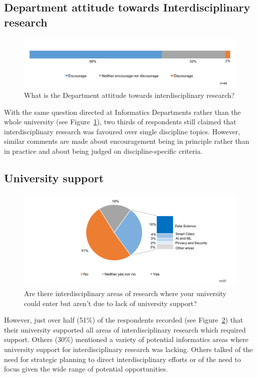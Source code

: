 \subsection{Department attitude towards Interdisciplinary research}


\begin{figure}[h]
\centering
\includegraphics[width = \linewidth]{charts/1b.png}
\caption{What is the Department attitude towards interdisciplinary research?}
\label{sect1:Dattitude}
\end{figure}

With the same question directed at Informatics Departments rather than the whole university (see Figure~\ref{sect1:Dattitude}), two thirds of respondents still claimed that interdisciplinary research was favoured over single discipline topics. However, similar comments are made about encouragement being in principle rather than in practice and about being judged on discipline-specific criteria.

\subsection{University support}

\begin{figure}[h]
\centering
\includegraphics[width = \linewidth]{charts/1c.png}
\caption{Are there interdisciplinary areas of research where your university
could enter but aren't due to lack of university support?}
\label{sect1:support}
\end{figure}

However, just over half (51\%) of the respondents recorded (see Figure~\ref{sect1:support}) that their university supported all areas of interdisciplinary research which required  support. Others (30\%) mentioned a variety of potential informatics areas where university support for interdisciplinary research was lacking. Others talked of the need for strategic planning to direct interdisciplinary efforts or of the need to focus given the wide range of potential opportunities.

